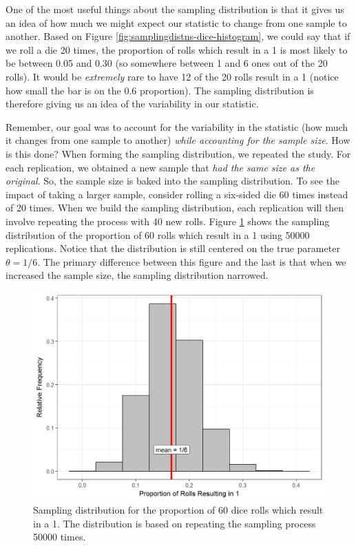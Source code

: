 \documentclass[]{book}
\theoremstyle{definition}
\theoremstyle{definition}
\theoremstyle{remark}
\begin{document}
One of the most useful things about the sampling distribution is that it
gives us an idea of how much we might expect our statistic to change
from one sample to another. Based on Figure
\ref{fig:samplingdistns-dice-histogram}, we could say that if we roll a
die 20 times, the proportion of rolls which result in a 1 is most likely
to be between 0.05 and 0.30 (so somewhere between 1 and 6 ones out of
the 20 rolls). It would be \emph{extremely} rare to have 12 of the 20
rolls result in a 1 (notice how small the bar is on the 0.6 proportion).
The sampling distribution is therefore giving us an idea of the
variability in our statistic.

Remember, our goal was to account for the variability in the statistic
(how much it changes from one sample to another) \emph{while accounting
for the sample size}. How is this done? When forming the sampling
distribution, we repeated the study. For each replication, we obtained a
new sample that \emph{had the same size as the original}. So, the sample
size is baked into the sampling distribution. To see the impact of
taking a larger sample, consider rolling a six-sided die 60 times
instead of 20 times. When we build the sampling distribution, each
replication will then involve repeating the process with 40 new rolls.
Figure \ref{fig:samplingdistns-dice-histogram2} shows the sampling
distribution of the proportion of 60 rolls which result in a 1 using
50000 replications. Notice that the distribution is still centered on
the true parameter \(\theta = 1/6\). The primary difference between this
figure and the last is that when we increased the sample size, the
sampling distribution narrowed.

\begin{figure}

{\centering \includegraphics[width=0.8\linewidth]{./Images/samplingdistns-dice-histogram2-1} 

}

\caption{Sampling distribution for the proportion of 60 dice rolls which result in a 1.  The distribution is based on repeating the sampling process 50000 times.}\label{fig:samplingdistns-dice-histogram2}
\end{figure}
\end{document}
